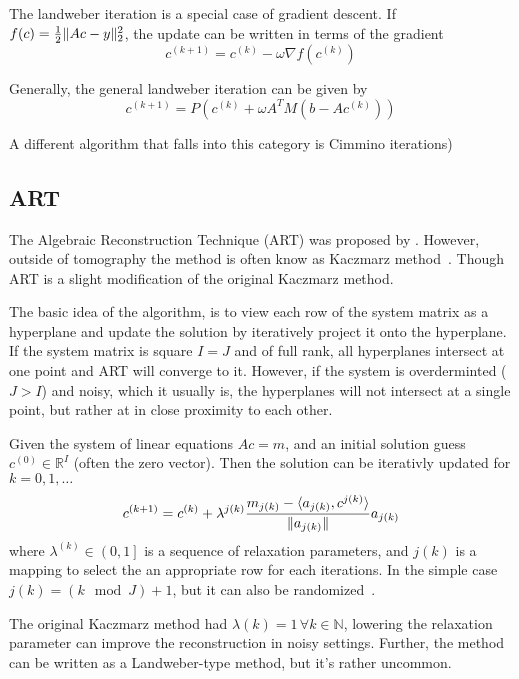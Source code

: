 The landweber iteration is a special case of gradient descent. If \(f(c) = \frac{1}{2} \lVert Ac -
	y\rVert_2^2\), the update can be written in terms of the gradient
\[
	c^{(k+1)} = c^{(k)} - \omega \nabla f(c^{(k)})
\]

Generally, the general landweber iteration can be given by
\[
	c^{(k+1)} = P(c^{(k)} + \omega A^TM(b - Ac^{(k)}))
\]

A different algorithm that falls into this category is Cimmino iterations\cite[chap 6.2]{hansen_discrete_2010})

\subsection{ART}\label{subsec:algebraic_reconstruction_technique}

The Algebraic Reconstruction Technique (ART) was proposed by
\citeauthor{gordon_algebraic_1970}\cite{gordon_algebraic_1970}. However, outside of tomography the
method is often know as Kaczmarz method~\cite{kaczmarz_approximate_1993}. Though ART is a slight
modification of the original Kaczmarz method.

The basic idea of the algorithm, is to view each row of the system matrix as a hyperplane and update
the solution by iteratively project it onto the hyperplane. If the system matrix is square \(I = J\)
and of full rank, all hyperplanes intersect at one point and ART will converge to it. However, if
the system is overderminted (\(J > I\)) and noisy, which it usually is, the hyperplanes will not
intersect at a single point, but rather at in close proximity to each other.

\begin{definition}\label{def:art}
	Given the system of linear equations \(Ac = m\), and an initial solution guess \(c^{(0)} \in
	\mathbb{R}^I\) (often the zero vector). Then the solution can be iterativly updated for
	\(k = 0, 1, \dots\)
	\[
		c^{(k+1)} = c^{(k)} + \lambda^{j(k)} \frac{m_{j(k)} - \langle a_{j(k)}, c^{j(k)} \rangle}{\lVert a_{j(k)}\rVert}a_{j(k)}
	\]
	where \(\lambda^{(k)} \in \left(0, 1\right]\) is a sequence of relaxation parameters, and
	\(j(k)\) is a mapping to select the an appropriate row for each iterations. In the simple
	case \(j(k) = (k \mod J) + 1\), but it can also be
	randomized~\cite{strohmer_randomized_2007}.
\end{definition}

The original Kaczmarz method had \(\lambda(k) = 1\, \forall k \in \mathbb{N}\), lowering the
relaxation parameter can improve the reconstruction in noisy settings. Further, the method can be
written as a Landweber-type method\cite{hansen_discrete_2010}, but it's rather uncommon.

